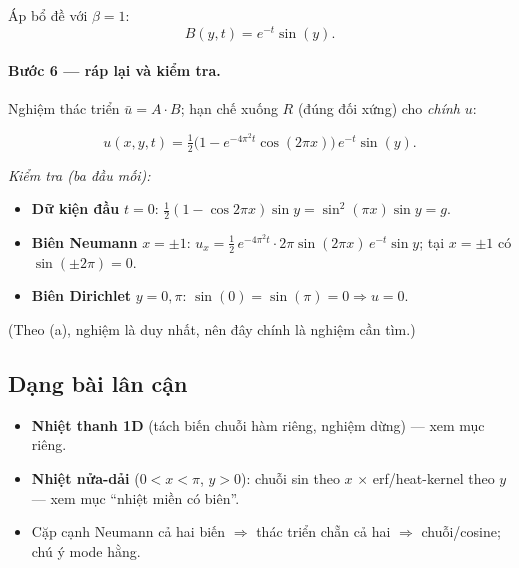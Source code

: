 Áp bổ đề với $\beta=1$:
\[
  B(y,t)=e^{-t}\sin(y).
\]

\paragraph{Bước 6 --- ráp lại và kiểm tra.}\leavevmode

Nghiệm thác triển $\bar u=A\cdot B$; hạn chế xuống $R$ (đúng đối xứng) cho \emph{chính} $u$:
\begin{nhobox}
\[
  \boxed{\;u(x,y,t)=\tfrac12\Big(1-e^{-4\pi^2 t}\cos(2\pi x)\Big)\,e^{-t}\sin(y).\;}
\]
\end{nhobox}

\emph{Kiểm tra (ba đầu mối):}
\begin{itemize}
\item \textbf{Dữ kiện đầu} $t=0$: $\tfrac12(1-\cos2\pi x)\sin y=\sin^2(\pi x)\sin y=g$. \checkmark
\item \textbf{Biên Neumann} $x=\pm1$: $u_x=\tfrac12\,e^{-4\pi^2 t}\cdot2\pi\sin(2\pi x)\,e^{-t}\sin y$; tại $x=\pm1$ có $\sin(\pm2\pi)=0$. \checkmark
\item \textbf{Biên Dirichlet} $y=0,\pi$: $\sin(0)=\sin(\pi)=0\Rightarrow u=0$. \checkmark
\end{itemize}
(Theo (a), nghiệm là duy nhất, nên đây chính là nghiệm cần tìm.)

\subsection*{Dạng bài lân cận}
\begin{itemize}
\item \textbf{Nhiệt thanh 1D} (tách biến chuỗi hàm riêng, nghiệm dừng) --- xem mục riêng.
\item \textbf{Nhiệt nửa-dải} ($0<x<\pi$, $y>0$): chuỗi sin theo $x$ $\times$ erf/heat-kernel theo $y$ --- xem mục ``nhiệt miền có biên''.
\item Cặp cạnh Neumann cả hai biến $\Rightarrow$ thác triển chẵn cả hai $\Rightarrow$ chuỗi/cosine; chú ý mode hằng.
\end{itemize}

